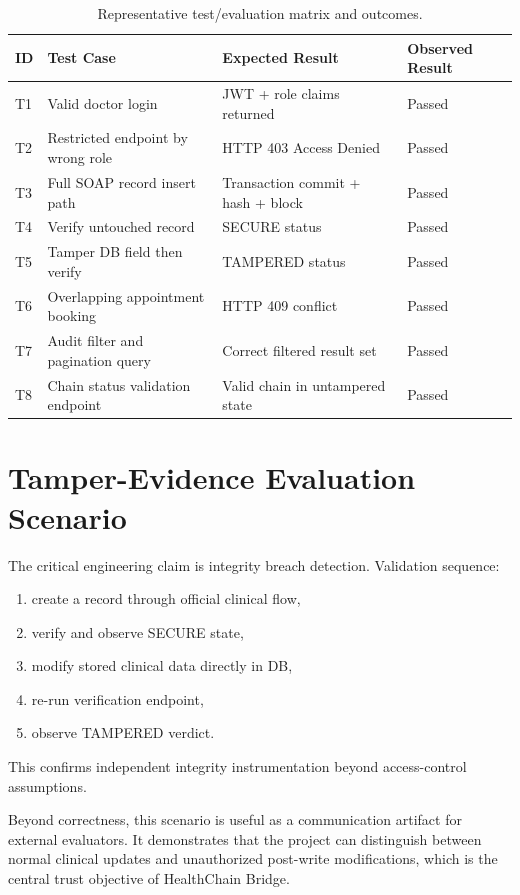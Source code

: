 \documentclass[12pt,a4paper]{report}
\begin{document}
\begin{table}[htbp]
\centering
\caption{Representative test/evaluation matrix and outcomes.}
\label{tab:test-cases}
\begin{tabular}{p{} p{} p{} p{}}
\toprule
\textbf{ID} & \textbf{Test Case} & \textbf{Expected Result} & \textbf{Observed Result} \\
\midrule
T1 & Valid doctor login & JWT + role claims returned & Passed \\
T2 & Restricted endpoint by wrong role & HTTP 403 Access Denied & Passed \\
T3 & Full SOAP record insert path & Transaction commit + hash + block & Passed \\
T4 & Verify untouched record & SECURE status & Passed \\
T5 & Tamper DB field then verify & TAMPERED status & Passed \\
T6 & Overlapping appointment booking & HTTP 409 conflict & Passed \\
T7 & Audit filter and pagination query & Correct filtered result set & Passed \\
T8 & Chain status validation endpoint & Valid chain in untampered state & Passed \\
\bottomrule
\end{tabular}
\end{table}

\section{Tamper-Evidence Evaluation Scenario}

The critical engineering claim is integrity breach detection. Validation sequence:

\begin{enumerate}
\item create a record through official clinical flow,
\item verify and observe SECURE state,
\item modify stored clinical data directly in DB,
\item re-run verification endpoint,
\item observe TAMPERED verdict.
\end{enumerate}

This confirms independent integrity instrumentation beyond access-control assumptions.

Beyond correctness, this scenario is useful as a communication artifact for external evaluators. It demonstrates that the project can distinguish between normal clinical updates and unauthorized post-write modifications, which is the central trust objective of HealthChain Bridge.
\end{document}
